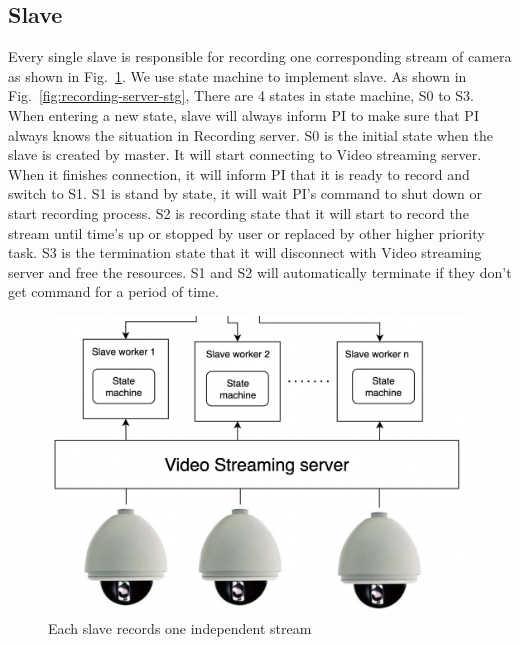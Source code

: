 \subsection{Slave}
Every single slave is responsible for recording one corresponding stream of camera as shown in Fig.~\ref{fig:recording-server-slave}. We use state machine to implement slave. As shown in Fig.~\ref{fig:recording-server-stg}, There are 4 states in state machine, S0 to S3. When entering a new state, slave will always inform PI to make sure that PI always knows the situation in Recording server. S0 is the initial state when the slave is created by master. It will start connecting to Video streaming server. When it finishes connection, it will inform PI that it is ready to record and switch to S1. S1 is stand by state, it will wait PI's command to shut down or start recording process. S2 is recording state that it will start to record the stream until time's up or stopped by user or replaced by other higher priority task. S3 is the termination state that it will disconnect with Video streaming server and free the resources. S1 and S2 will automatically terminate if they don't get command for a period of time.

\begin{figure}[H]
    \centering
    \includegraphics[width=\textwidth]{figsrc/recording-server-slave.png}
    \caption{Each slave records one independent stream\label{fig:recording-server-slave}}
\end{figure}


